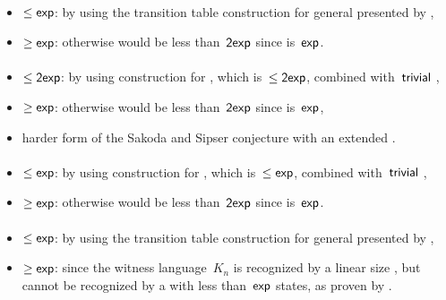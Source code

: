 \paragraph{\OMOLA{}\tto\ONFA}\label{cost:OM1LAto1NFA}
\begin{itemize}
	\item $\le\mathsf{exp}$: by using the transition table construction for general \OLAs presented by ,
	\item $\ge\mathsf{exp}$: otherwise \hyperref[cost:OM1LAto1DFA]{\OMOLA{}\tto\ODFA} would be less than~$\mathsf{2exp}$ since\linebreak\hyperref[cost:1NFAto1DFA]{\ONFA{}\tto\ODFA} is~$\mathsf{exp}$.
\end{itemize}
\paragraph{\OMOLA{}\tto\TDFA}
\begin{itemize}
	\item $\le\mathsf{2exp}$: by using construction for \hyperref[cost:OM1LAto1DFA]{\OMOLA{}\tto\ODFA}, which is~$\le\mathsf{2exp}$, combined with~$\mathsf{trivial}$ \ODFA{}\tto\TDFA,
	\item $\ge\mathsf{exp}$: otherwise \hyperref[cost:OM1LAto1DFA]{\OMOLA{}\tto\ODFA} would be less than~$\mathsf{2exp}$ since\linebreak\hyperref[cost:2DFAto1DFA]{\TDFA{}\tto\ODFA} is~$\mathsf{exp}$,
	\item harder form of the Sakoda and Sipser conjecture with an extended \TNFA.
\end{itemize}
\paragraph{\OMOLA{}\tto\TNFA}
\begin{itemize}
	\item $\le\mathsf{exp}$: by using construction for \hyperref[cost:OM1LAto1NFA]{\OMOLA{}\tto\ONFA}, which is~$\le\mathsf{exp}$, combined with~$\mathsf{trivial}$ \ONFA{}\tto\TNFA,
	\item $\ge\mathsf{exp}$: otherwise \hyperref[cost:OM1LAto1DFA]{\OMOLA{}\tto\ODFA} would be less than~$\mathsf{2exp}$ since\linebreak\hyperref[cost:2NFAto1DFA]{\TNFA{}\tto\ODFA} is~$\mathsf{exp}$.
\end{itemize}
\paragraph{\OMODLA{}\tto\ODFA}\label{cost:OM1DLAto1DFA}
\begin{itemize}
	\item $\le\mathsf{exp}$: by using the transition table construction for general \ODLAs presented by ,
	\item $\ge\mathsf{exp}$: since the witness language~$K_n$ is recognized by a linear size \OMODLA, but cannot be recognized by a \TNFA with less than~$\mathsf{exp}$ states, as proven by .
\end{itemize}

